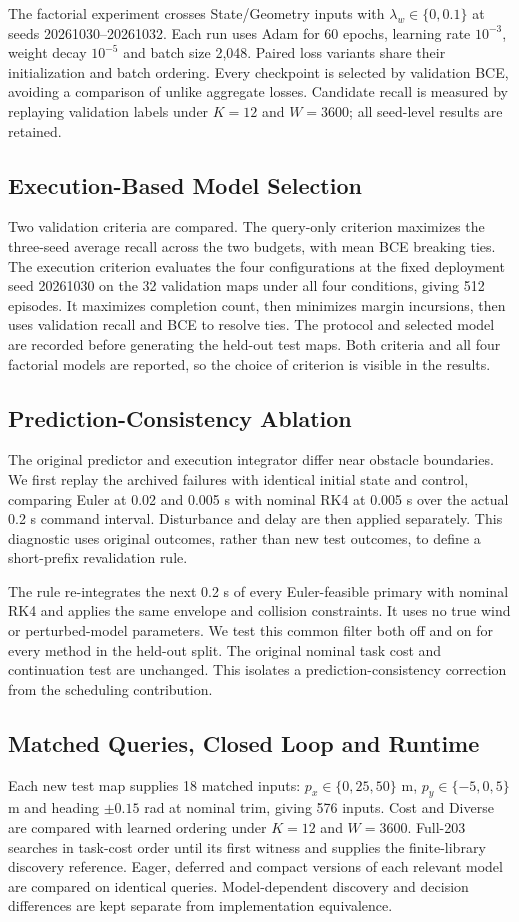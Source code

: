 \documentclass[journal]{IEEEtran}
\begin{document}
The factorial experiment crosses State/Geometry inputs with $\lambda_w\in\{0,0.1\}$ at seeds 20261030--20261032. Each run uses Adam for 60 epochs, learning rate $10^{-3}$, weight decay $10^{-5}$ and batch size 2,048. Paired loss variants share their initialization and batch ordering. Every checkpoint is selected by validation BCE, avoiding a comparison of unlike aggregate losses. Candidate recall is measured by replaying validation labels under $K=12$ and $W=3600$; all seed-level results are retained.

\subsection{Execution-Based Model Selection}
Two validation criteria are compared. The query-only criterion maximizes the three-seed average recall across the two budgets, with mean BCE breaking ties. The execution criterion evaluates the four configurations at the fixed deployment seed 20261030 on the 32 validation maps under all four conditions, giving 512 episodes. It maximizes completion count, then minimizes margin incursions, then uses validation recall and BCE to resolve ties. The protocol and selected model are recorded before generating the held-out test maps. Both criteria and all four factorial models are reported, so the choice of criterion is visible in the results.

\subsection{Prediction-Consistency Ablation}
The original predictor and execution integrator differ near obstacle boundaries. We first replay the archived failures with identical initial state and control, comparing Euler at 0.02 and 0.005 s with nominal RK4 at 0.005 s over the actual 0.2 s command interval. Disturbance and delay are then applied separately. This diagnostic uses original outcomes, rather than new test outcomes, to define a short-prefix revalidation rule.

The rule re-integrates the next 0.2 s of every Euler-feasible primary with nominal RK4 and applies the same envelope and collision constraints. It uses no true wind or perturbed-model parameters. We test this common filter both off and on for every method in the held-out split. The original nominal task cost and continuation test are unchanged. This isolates a prediction-consistency correction from the scheduling contribution.

\subsection{Matched Queries, Closed Loop and Runtime}
Each new test map supplies 18 matched inputs: $p_x\in\{0,25,50\}$ m, $p_y\in\{-5,0,5\}$ m and heading $\pm0.15$ rad at nominal trim, giving 576 inputs. Cost and Diverse are compared with learned ordering under $K=12$ and $W=3600$. Full-203 searches in task-cost order until its first witness and supplies the finite-library discovery reference. Eager, deferred and compact versions of each relevant model are compared on identical queries. Model-dependent discovery and decision differences are kept separate from implementation equivalence.
\end{document}
